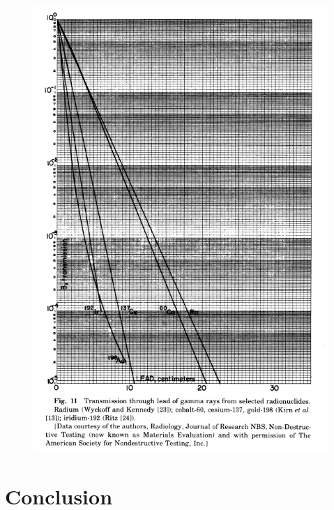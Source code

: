 \documentclass[%
aps,
mph,%
amsmath,amssymb,
preprint,%
tightenlines,
longbibliography,
superscriptaddress,
floatfix,
nofootinbib,
]{revtex4-2}
\begin{document}
    \begin{figure}[h!]
        \centering
        \includegraphics[width=0.75\linewidth]{figures/image.png}
    \end{figure}

    
\section{Conclusion}


\end{document}
